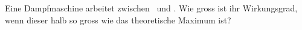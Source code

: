 Eine Dampfmaschine arbeitet zwischen \twO\ und \tkO. Wie gross ist ihr Wirkungsgrad, wenn dieser halb so gross wie das theoretische Maximum ist?
